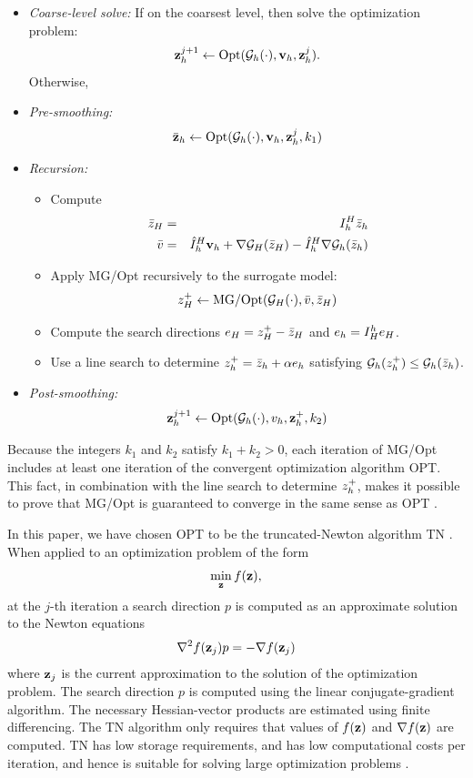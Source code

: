\documentclass{siamltex}
\begin{document}
\begin{itemize}
\item {\em Coarse-level solve:}  If on the coarsest level, then solve the optimization problem:
$$
\bz_h^{j+1} \leftarrow
\mbox{Opt}(\cg_h(\cdot),\bv_h,\bz_h^j).
$$
Otherwise,
\item {\em Pre-smoothing:}
$$
\bar \bz_h \leftarrow \mbox{Opt}(\cg_h(\cdot),\bv_h,\bz_h^j,k_1)
$$
\item {\em Recursion:}
\begin{itemize}
\item Compute
\begin{eqnarray*}
\zHbar &=& \IhH\zhbar \\
\vbar &=& \IhHb \bv_h + \nabla \cg_H(\zHbar) - \IhHb\nabla \cg_h(\zhbar)
\end{eqnarray*}
\item Apply MG/Opt recursively to the surrogate model:
$$
\zHplus \leftarrow
\mbox{MG/Opt}(\cg_H(\cdot),\vbar,\zHbar)
$$
\item Compute the search directions $e_H = z_H^+ - \bar z_H$ and $e_h = I_H^h e_H$.
\item Use a line search to determine $z_h^+ = \bar z_h + \alpha e_h$ satisfying $\cg_h(\zhplus) \le \cg_h(\zhbar)$.
\end{itemize}
\item {\em Post-smoothing:}
$$
\bz_h^{j+1} \leftarrow \mbox{Opt}(\cg_h(\cdot),v_h,\bz_h^+,k_2)
$$
\end{itemize}

Because the integers $k_1$ and $k_2$ satisfy $k_1+k_2>0$, each iteration of MG/Opt includes at least one iteration of the convergent optimization algorithm OPT.  This fact, in combination with the line search to determine $z_h^+$, makes it possible to prove that MG/Opt is guaranteed to converge in the same sense as OPT  \cite{Nash10a}.

In this paper, we have chosen OPT to be the truncated-Newton algorithm TN \cite{Nash84sw}.  When applied to an optimization problem of the form
$$
\min_{\bf z} f({\bf z}),
$$
at the $j$-th iteration a search direction $p$ is computed as an approximate solution to the Newton equations
$$
\nabla^2 f({\bf z}_j) p = -\nabla f({\bf z}_j)
$$
where ${\bf z}_j$ is the current approximation to the solution of the optimization problem.  The search direction $p$ is computed using the linear conjugate-gradient algorithm.  The necessary Hessian-vector products are estimated using finite differencing.  The TN algorithm only requires that values of $f({\bf z})$ and $\nabla f({\bf z})$ are computed.  TN has low storage requirements, and has low computational costs per iteration, and hence is suitable for solving large optimization problems \cite{NaNo91a}.
\end{document}
